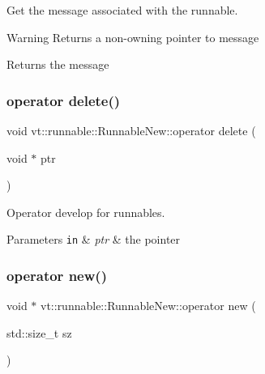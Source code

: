 Get the message associated with the runnable. 

\begin{DoxyWarning}{Warning}
Returns a non-\/owning pointer to message
\end{DoxyWarning}
\begin{DoxyReturn}{Returns}
the message 
\end{DoxyReturn}
\mbox{\label{structvt_1_1runnable_1_1_runnable_new_a1e5a02fffcec8b10eb11666a1e0f4120}} 
\subsubsection{\texorpdfstring{operator delete()}{operator delete()}}
{\footnotesize\ttfamily void vt\+::runnable\+::\+Runnable\+New\+::operator delete (\begin{DoxyParamCaption}\item[{void $\ast$}]{ptr }\end{DoxyParamCaption})\hspace{0.3cm}{\ttfamily [static]}}



Operator develop for runnables. 


\begin{DoxyParams}[1]{Parameters}
\mbox{\tt in}  & {\em ptr} & the pointer \\
\hline
\end{DoxyParams}
\mbox{\label{structvt_1_1runnable_1_1_runnable_new_a5d8c6436fb1652aa48d9b46798a068e5}} 
\subsubsection{\texorpdfstring{operator new()}{operator new()}}
{\footnotesize\ttfamily void $\ast$ vt\+::runnable\+::\+Runnable\+New\+::operator new (\begin{DoxyParamCaption}\item[{std\+::size\+\_\+t}]{sz }\end{DoxyParamCaption})\hspace{0.3cm}{\ttfamily [static]}}



